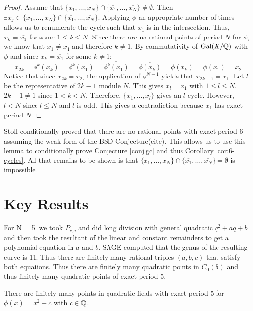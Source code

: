 \begin{proof}
	Assume that $\{x_1, \ldots, x_{N}\} \cap
	\{\overline{x_1}, \ldots, \overline{x_{N}}\} \neq \emptyset$.
	Then $\exists x_j \in \{x_1, \ldots, x_{N}\} \cap
	\{\overline{x_1}, \ldots, \overline{x_{N}}\}$. Applying $\phi$
	an appropriate number of times allows us to renumerate the cycle
	such that $x_1$ is in the intersection. Thus, $x_k = \overline{x_1}$
	for some $1 \leq k \leq N$. Since there are no rational points of
	period $N$ for $\phi$, we know that $x_1 \neq \overline{x_1}$ and
	therefore $k \neq 1$. By commutativity of $\mathrm{Gal}(K/\mathbb{Q})$ with $\phi$
	and since $x_k = \overline{x_1}$ for some $k \neq 1$:
	\[
		x_{2k} = \phi^k(x_k) = \phi^k(\overline{x_1}) = \overline{\phi^k(x_1)}
		= \overline{\phi(x_k)} = \phi(\overline{x_k}) = \phi(x_1) = x_2
	\]
	Notice that since $x_{2k} = x_2$, the application of $\phi^{N-1}$
	yields	that $x_{2k-1} = x_1$. Let $l$ be the representative of $2k-1$
	module $N$. This gives $x_l = x_1$ with $1 \leq l \leq N$. $2k-1 \neq 1$
	since $1 < k < N$. Therefore, $\{x_1, \ldots, x_l\}$ gives an $l$-cycle.
	However, $l < N$ since $l \leq N$ and $l$ is odd. This gives a
	contradiction because $x_1$ has exact period $N$.
\end{proof}

\begin{remark}[N = 6 case]
	Stoll conditionally proved that there are no rational points with exact
	period 6 assuming the weak form of the BSD Conjecture(cite). This allows
	us to use this lemma to conditionally prove Conjecture \ref{conj:gc} and thus
	Corollary \ref{cor:6-cycles}. All that remains to be shown is that
	$\{x_1, \ldots, x_{N}\} \cap \{\overline{x_1}, \ldots, \overline{x_{N}}\} =
	\emptyset$ is impossible.
\end{remark}

\section{Key Results}

For N = 5, we took $P_{c,q}$ and did long division with general quadratic $q^2 + aq + b$
and then took the resultant of the linear and constant remainders to get a
polynomial equation in $a$ and $b$. SAGE computed that the genus of the resulting
curve is 11. Thus there are finitely many rational triples $(a,b,c)$ that satisfy
both equations. Thus there are finitely many quadratic points in $C_0(5)$ and thus
finitely many quadratic points of exact period 5.
\begin{theorem}
There are finitely many points in quadratic fields with exact period 5 for
$\phi(x) = x^2 + c$ with $c \in \mathbb{Q}$.
\end{theorem}


